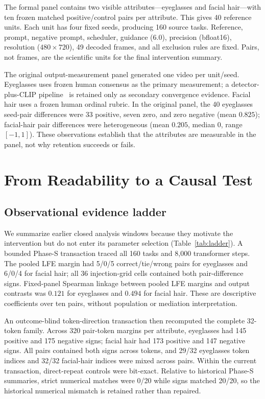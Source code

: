 \documentclass[10pt,twocolumn,letterpaper]{article}
\begin{document}
The formal panel contains two visible attributes—eyeglasses and facial hair—with ten frozen matched positive/control pairs per attribute.  This gives 40 reference units.  Each unit has four fixed seeds, producing 160 source tasks.  Reference, prompt, negative prompt, scheduler, guidance ($6.0$), precision (bfloat16), resolution ($480\times720$), 49 decoded frames, and all exclusion rules are fixed.  Pairs, not frames, are the scientific units for the final intervention summary.

The original output-measurement panel generated one video per unit/seed.  Eyeglasses uses frozen human consensus as the primary measurement; a detector-plus-CLIP pipeline~\cite{radford2021clip} is retained only as secondary convergence evidence.  Facial hair uses a frozen human ordinal rubric.  In the original panel, the 40 eyeglasses seed-pair differences were 33 positive, seven zero, and zero negative (mean $0.825$); facial-hair pair differences were heterogeneous (mean $0.205$, median $0$, range $[-1,1]$).  These observations establish that the attributes are measurable in the panel, not why retention succeeds or fails.

\section{From Readability to a Causal Test}
\label{sec:observational}

\subsection{Observational evidence ladder}

We summarize earlier closed analysis windows because they motivate the intervention but do not enter its parameter selection (Table~\ref{tab:ladder}).  A bounded Phase-S transaction traced all 160 tasks and 8,000 transformer steps.  The pooled LFE margin had 5/0/5 correct/tie/wrong pairs for eyeglasses and 6/0/4 for facial hair; all 36 injection-grid cells contained both pair-difference signs.  Fixed-panel Spearman linkage between pooled LFE margins and output contrasts was $0.121$ for eyeglasses and $0.494$ for facial hair.  These are descriptive coefficients over ten pairs, without population or mediation interpretation.

An outcome-blind token-direction transaction then recomputed the complete 32-token family.  Across 320 pair-token margins per attribute, eyeglasses had 145 positive and 175 negative signs; facial hair had 173 positive and 147 negative signs.  All pairs contained both signs across tokens, and 29/32 eyeglasses token indices and 32/32 facial-hair indices were mixed across pairs.  Within the current transaction, direct-repeat controls were bit-exact.  Relative to historical Phase-S summaries, strict numerical matches were 0/20 while signs matched 20/20, so the historical numerical mismatch is retained rather than repaired.
\end{document}
